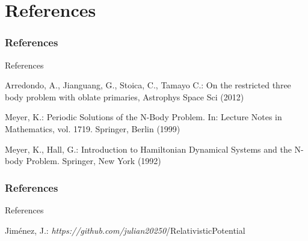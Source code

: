\documentclass{beamer}
\begin{document}
	\section{References}
	\begin{frame}
	\frametitle{References}
	\begin{block}{References}
	\begin{thebibliography}{99}
	 Arredondo, A., Jianguang, G., Stoica, C., Tamayo C.: On the restricted three body problem with oblate primaries, Astrophys Space Sci (2012)
	
	Meyer, K.: Periodic Solutions of the N-Body Problem. In: Lecture
Notes in Mathematics, vol. 1719. Springer, Berlin (1999)

	Meyer, K., Hall, G.: Introduction to Hamiltonian Dynamical Systems
and the N-body Problem. Springer, New York (1992)
	\end{thebibliography}
	\end{block}
	\end{frame}
	
	\begin{frame}
	\frametitle{References}
	\begin{block}{References}
	\begin{thebibliography}{99}
	 Jiménez, J.: \textit{https://github.com/julian20250}/RelativisticPotential
	\end{thebibliography}
	\end{block}
	\end{frame}
	
\end{document}
